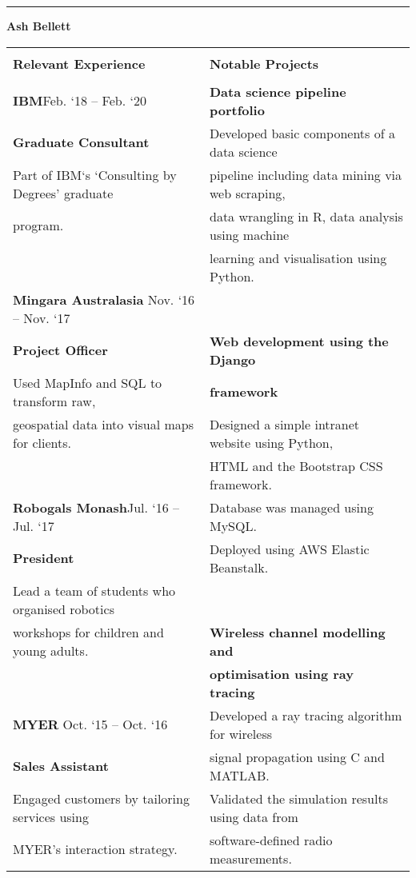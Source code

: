 \documentclass{letter}
\begin{document}
	\centering
	\rule{\textwidth}{2mm}
	\LARGE
	\textbf{Ash Bellett}\\
	\large
	\begin{center}
	\begin{tabularx}{\textwidth}{X | X}
	\hline
	 & \\
	\Large \textbf{Relevant Experience} & \Large \textbf{Notable Projects}\\
	 & \\
	\large \textbf{IBM}\hfill Feb. `18 -- Feb. `20 & \textbf{Data science pipeline portfolio} \\
	\textbf{Graduate Consultant} & Developed basic components of a data science \\
	Part of IBM`s `Consulting by Degrees' graduate & pipeline including data mining via web scraping, \\
	program. & data wrangling in R, data analysis using machine\\
	 & learning and visualisation using Python.\\
	\textbf{Mingara Australasia} \hfill Nov. `16 -- Nov. `17 & \\
	\textbf{Project Officer} & \textbf{Web development using the Django}\\
	Used MapInfo and SQL to transform raw, & \textbf{framework}\\
	geospatial data into visual maps for clients. & Designed a simple intranet website using Python,\\
	 & HTML and the Bootstrap CSS framework.\\
	\textbf{Robogals Monash}\hfill Jul. `16 -- Jul. `17 & Database was managed using MySQL.\\
	\textbf{President} & Deployed using AWS Elastic Beanstalk.\\
	Lead a team of students who organised robotics & \\
	workshops for children and young adults. & \textbf{Wireless channel modelling and}\\
	 & \textbf{optimisation using ray tracing}\\
	\textbf{MYER} \hfill Oct. `15 -- Oct. `16 & Developed a ray tracing algorithm for wireless\\
	\textbf{Sales Assistant} & signal propagation using C and MATLAB.\\
	Engaged customers by tailoring services using & Validated the simulation results using data from\\
	MYER's interaction strategy. & software-defined radio measurements.\\

\end{tabularx}
\end{center}
\end{document}
